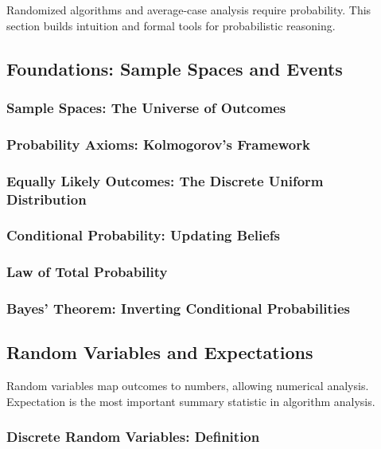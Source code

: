 \begin{sectionintro}
Randomized algorithms and average-case analysis require probability.
This section builds intuition and formal tools for probabilistic reasoning.
\end{sectionintro}

\subsection{Foundations: Sample Spaces and Events}
\label{subsec:sample-spaces}

\subsubsection{Sample Spaces: The Universe of Outcomes}
\subsubsection{Probability Axioms: Kolmogorov's Framework}
\subsubsection{Equally Likely Outcomes: The Discrete Uniform Distribution}
\subsubsection{Conditional Probability: Updating Beliefs}
\subsubsection{Law of Total Probability}
\subsubsection{Bayes' Theorem: Inverting Conditional Probabilities}


\subsection{Random Variables and Expectations}
\label{subsec:random-variables}

\begin{subsectionintro}
Random variables map outcomes to numbers, allowing numerical analysis.
Expectation is the most important summary statistic in algorithm analysis.
\end{subsectionintro}
\subsubsection{Discrete Random Variables: Definition}

